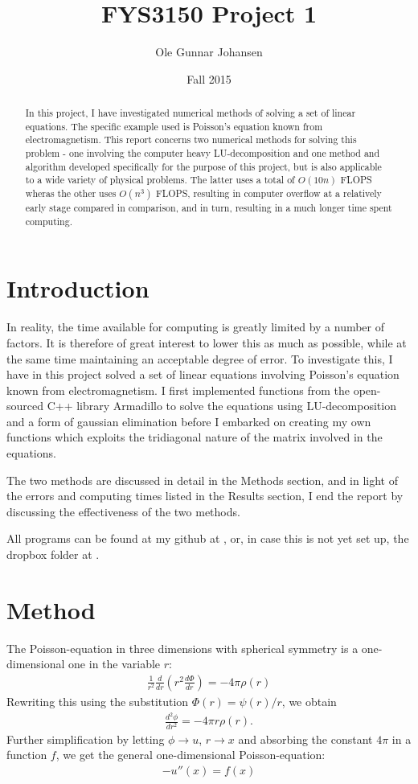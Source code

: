 \documentclass[11pt]{article}
\title{FYS3150 Project 1}
\date{Fall 2015}
\author{Ole Gunnar Johansen}
\begin{document}
	\maketitle
	
	\begin{abstract}
		In this project, I have investigated numerical methods of solving a set of linear equations. The specific example used is Poisson's equation known from electromagnetism. This report concerns two numerical methods for solving this problem - one involving the computer heavy LU-decomposition and one method and algorithm developed specifically for the purpose of this project, but is also applicable to a wide variety of physical problems. The latter uses a total of $O(10n)$ FLOPS wheras the other uses $O(n^3)$ FLOPS, resulting in computer overflow at a relatively early stage compared in comparison, and in turn, resulting in a much longer time spent computing.
	\end{abstract}
	
	\section{Introduction}
		In reality, the time available for computing is greatly limited by a number of factors. It is therefore of great interest to lower this as much as possible, while at the same time maintaining an acceptable degree of error. To investigate this, I have in this project solved a set of linear equations involving Poisson's equation known from electromagnetism. I first implemented functions from the open-sourced C++ library Armadillo to solve the equations using LU-decomposition and a form of gaussian elimination before I embarked on creating my own functions which exploits the tridiagonal nature of the matrix involved in the equations. 
		
		The two methods are discussed in detail in the Methods section, and in light of the errors and computing times listed in the Results section, I end the report by discussing the effectiveness of the two methods.
		
		All programs can be found at my github at \cite{github}, or, in case this is not yet set up, the dropbox folder at \cite{dropbox}.
	
	
	\section{Method}
		The Poisson-equation in three dimensions with spherical symmetry is a one-dimensional one in the variable $r$:
		\begin{align}
			\frac{1}{r^2}\frac{d}{dr}\left( r^2 \frac{d\Phi}{dr} \right) = -4\pi\rho(r)
		\end{align}
		Rewriting this using the substitution $\Phi(r) = \psi(r)/r$, we obtain 
		\begin{align}
			\frac{d^2\phi}{dr^2} = -4\pi r \rho(r).
		\end{align}
		Further simplification by letting $\phi \rightarrow u$, $r \rightarrow x$ and absorbing the constant $4\pi$ in a function $f$, we get the general one-dimensional Poisson-equation:
		\begin{align}
			-u''(x) = f(x)
		\end{align}
		
\end{document}
